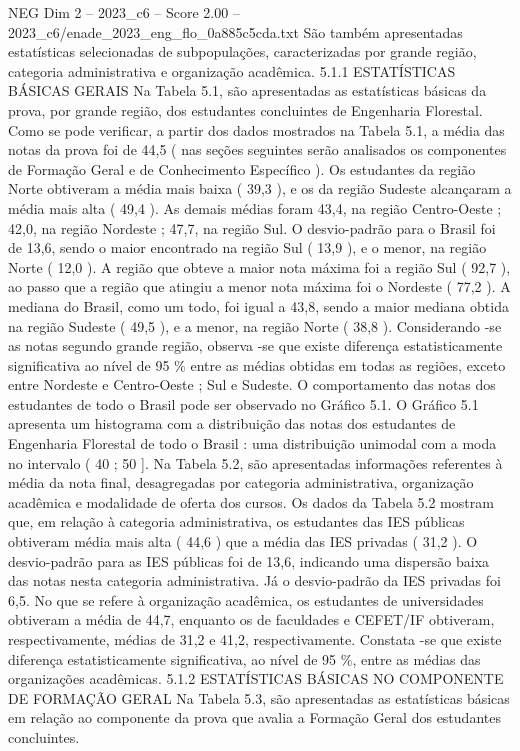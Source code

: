 \begin{textsample}{NEG Dim 2 – 2023\_c6 – Score 2.00 – 2023\_c6/enade\_2023\_eng\_flo\_0a885c5cda.txt}
São também apresentadas estatísticas selecionadas de subpopulações, caracterizadas por grande região, categoria administrativa e organização acadêmica. 5.1.1 ESTATÍSTICAS BÁSICAS GERAIS Na Tabela 5.1, são apresentadas as estatísticas básicas da prova, por grande região, dos estudantes concluintes de Engenharia Florestal.
Como se pode verificar, a partir dos dados mostrados na Tabela 5.1, a média das notas da prova foi de 44,5 ( nas seções seguintes serão analisados os componentes de Formação Geral e de Conhecimento Específico ).
Os estudantes da região Norte obtiveram a média mais baixa ( 39,3 ), e os da região Sudeste alcançaram a média mais alta ( 49,4 ).
As demais médias foram 43,4, na região Centro-Oeste ; 42,0, na região Nordeste ; 47,7, na região Sul.
O desvio-padrão para o Brasil foi de 13,6, sendo o maior encontrado na região Sul ( 13,9 ), e o menor, na região Norte ( 12,0 ).
A região que obteve a maior nota máxima foi a região Sul ( 92,7 ), ao passo que a região que atingiu a menor nota máxima foi o Nordeste ( 77,2 ).
A mediana do Brasil, como um todo, foi igual a 43,8, sendo a maior mediana obtida na região Sudeste ( 49,5 ), e a menor, na região Norte ( 38,8 ).
Considerando -se as notas segundo grande região, observa -se que existe diferença estatisticamente significativa ao nível de 95 \% entre as médias obtidas em todas as regiões, exceto entre Nordeste e Centro-Oeste ; Sul e Sudeste.
O comportamento das notas dos estudantes de todo o Brasil pode ser observado no Gráfico 5.1.
O Gráfico 5.1 apresenta um histograma com a distribuição das notas dos estudantes de Engenharia Florestal de todo o Brasil : uma distribuição unimodal com a moda no intervalo ( 40 ; 50 ].
Na Tabela 5.2, são apresentadas informações referentes à média da nota final, desagregadas por categoria administrativa, organização acadêmica e modalidade de oferta dos cursos.
Os dados da Tabela 5.2 mostram que, em relação à categoria administrativa, os estudantes das IES públicas obtiveram média mais alta ( 44,6 ) que a média das IES privadas ( 31,2 ).
O desvio-padrão para as IES públicas foi de 13,6, indicando uma dispersão baixa das notas nesta categoria administrativa.
Já o desvio-padrão da IES privadas foi 6,5.
No que se refere à organização acadêmica, os estudantes de universidades obtiveram a média de 44,7, enquanto os de faculdades e CEFET/IF obtiveram, respectivamente, médias de 31,2 e 41,2, respectivamente.
Constata -se que existe diferença estatisticamente significativa, ao nível de 95 \%, entre as médias das organizações acadêmicas. 5.1.2 ESTATÍSTICAS BÁSICAS NO COMPONENTE DE FORMAÇÃO GERAL Na Tabela 5.3, são apresentadas as estatísticas básicas em relação ao componente da prova que avalia a Formação Geral dos estudantes concluintes.

\end{textsample}
